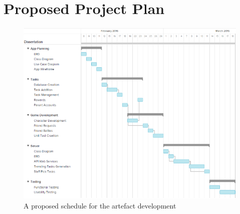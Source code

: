 \chapter{Proposed Project Plan}

\begin{figure}[ht]
	\centering
	\includegraphics[scale=0.7]{images/ganttchart.png}
	\caption{A proposed schedule for the artefact development}
\end{figure}